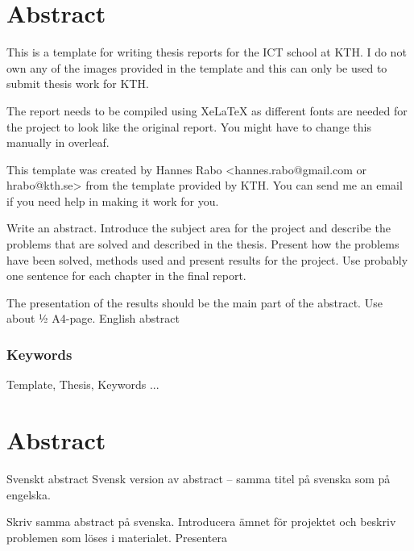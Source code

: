 \newpage
\thispagestyle{plain}
\chapter*{Abstract}

This is a template for writing thesis reports for the ICT school at KTH. I do not own any of the images provided in the template and this can only be used to submit thesis work for KTH.

The report needs to be compiled using XeLaTeX as different fonts are needed for the project to look like the original report. You might have to change this manually in overleaf.

This template was created by Hannes Rabo <hannes.rabo@gmail.com or hrabo@kth.se> from the template provided by KTH. You can send me an email if you need help in making it work for you.


\vspace{2cm}
Write an abstract. Introduce the subject area for the project and describe the problems that are solved and described in the thesis. Present how the problems have been solved, methods used and present results for the project. Use probably one sentence for each chapter in the final report.

The presentation of the results should be the main part of the abstract. Use about ½ A4-page.
English abstract




\subsection*{Keywords}
Template, Thesis, Keywords ...





\newpage
\thispagestyle{plain}
\chapter*{Abstract}
Svenskt abstract
Svensk version av abstract – samma titel på svenska som på engelska.

Skriv samma abstract på svenska. Introducera ämnet för projektet och beskriv problemen som löses i materialet. Presentera

